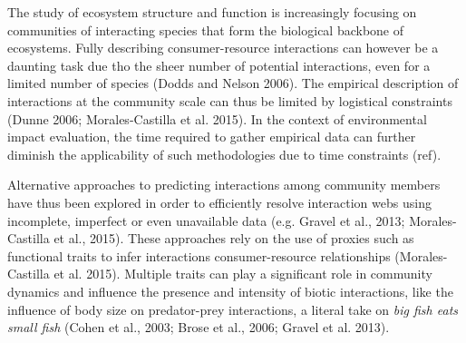 \documentclass[letterpaper]{article}
\begin{document}
The study of ecosystem structure and function is increasingly focusing on communities of interacting species that form the biological backbone of ecosystems. Fully describing consumer-resource interactions can however be a daunting task due tho the sheer number of potential interactions, even for a limited number of species (Dodds and Nelson 2006). The empirical description of interactions at the community scale can thus be limited by logistical constraints (Dunne 2006; Morales-Castilla et al. 2015). In the context of environmental impact evaluation, the time required to gather empirical data can further diminish the applicability of such methodologies due to time constraints (ref).





Alternative approaches to predicting interactions among community members have thus been explored in order to efficiently resolve interaction webs using incomplete, imperfect or even unavailable data (e.g. Gravel et al., 2013; Morales-Castilla et al., 2015). These approaches rely on the use of proxies such as functional traits to infer interactions consumer-resource relationships (Morales-Castilla et al. 2015). Multiple traits can play a significant role in community dynamics and influence the presence and intensity of biotic interactions, like the influence of body size on predator-prey interactions, a literal take on \textit{big fish eats small fish} (Cohen et al., 2003; Brose et al., 2006; Gravel et al. 2013).
\end{document}

